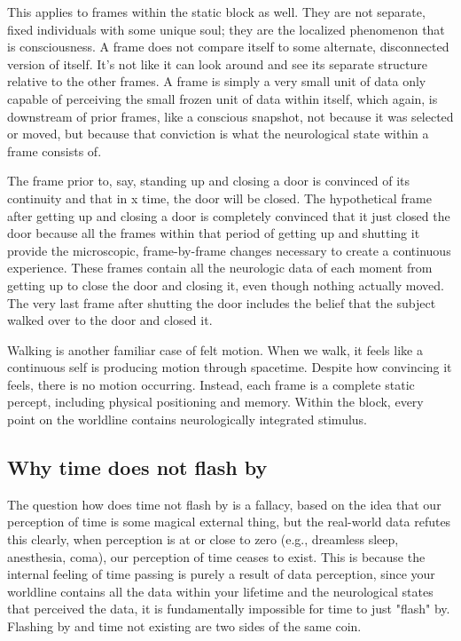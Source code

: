 \documentclass[11pt,a4paper]{article}
\begin{document}
This applies to frames within the static block as well. They are not separate, fixed individuals with some unique soul; they are the localized phenomenon that is consciousness. A frame does not compare itself to some alternate, disconnected version of itself. It’s not like it can look around and see its separate structure relative to the other frames. A frame is simply a very small unit of data only capable of perceiving the small frozen unit of data within itself, which again, is downstream of prior frames, like a conscious snapshot, not because it was selected or moved, but because that conviction is what the neurological state within a frame consists of.

The frame prior to, say, standing up and closing a door is convinced of its continuity and that in x time, the door will be closed. The hypothetical frame after getting up and closing a door is completely convinced that it just closed the door because all the frames within that period of getting up and shutting it provide the microscopic, frame-by-frame changes necessary to create a continuous experience. These frames contain all the neurologic data of each moment from getting up to close the door and closing it, even though nothing actually moved. The very last frame after shutting the door includes the belief that the subject walked over to the door and closed it.

Walking is another familiar case of felt motion. When we walk, it feels like a continuous self is producing motion through spacetime. Despite how convincing it feels, there is no motion occurring. Instead, each frame is a complete static percept, including physical positioning and memory. Within the block, every point on the worldline contains neurologically integrated stimulus.

\subsection{Why time does not flash by}

The question how does time not flash by is a fallacy, based on the idea that our perception of time is some magical external thing, but the real-world data refutes this clearly, when perception is at or close to zero (e.g., dreamless sleep, anesthesia, coma), our perception of time ceases to exist. This is because the internal feeling of time passing is purely a result of data perception, since your worldline contains all the data within your lifetime and the neurological states that perceived the data, it is fundamentally impossible for time to just "flash" by. Flashing by and time not existing are two sides of the same coin.
\end{document}
